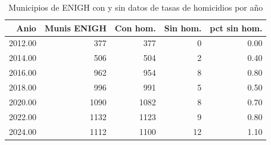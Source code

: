 \begin{table}[ht]
\centering
\caption{Municipios de ENIGH con y sin datos de tasas de homicidios por a\~{n}o} 
\label{tab:08a_munis_enigh_vs_hom}
\begin{tabular}{rrrrr}
  \toprule
Anio & Munis ENIGH & Con hom. & Sin hom. & pct sin hom. \\ 
  \midrule
2012.00 & 377 & 377 &   0 & 0.00 \\ 
  2014.00 & 506 & 504 &   2 & 0.40 \\ 
  2016.00 & 962 & 954 &   8 & 0.80 \\ 
  2018.00 & 996 & 991 &   5 & 0.50 \\ 
  2020.00 & 1090 & 1082 &   8 & 0.70 \\ 
  2022.00 & 1132 & 1123 &   9 & 0.80 \\ 
  2024.00 & 1112 & 1100 &  12 & 1.10 \\ 
   \bottomrule
\end{tabular}
\end{table}
